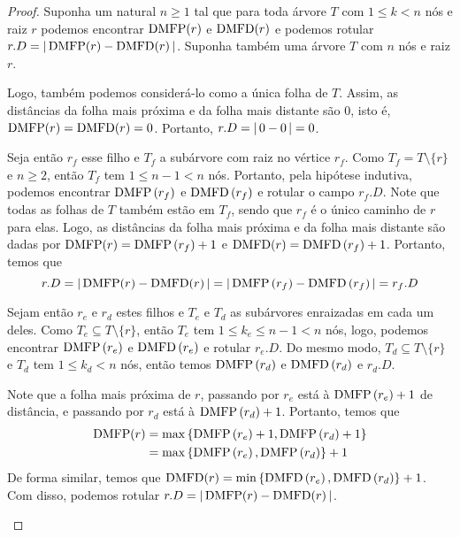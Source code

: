 \begin{proof}\resetCasos
    Suponha um natural $n \geq 1$ tal que para toda árvore $T$ com $1 \leq k < n$ nós e raiz $r$ podemos encontrar $\operatorname{DMFP}(r)$ e $\operatorname{DMFD}(r)$ e podemos rotular $r.D = {\lvert\,\operatorname{DMFP}(r) - \operatorname{DMFD}(r)\,\rvert}$. Suponha também uma árvore $T$ com $n$ nós e raiz $r$.

    \begin{case}
        Logo, também podemos considerá-lo como a única folha de $T$. Assim, as distâncias da folha mais próxima e da folha mais distante são 0, isto é, $\operatorname{DMFP}(r) = \operatorname{DMFD}(r) = 0$. Portanto, $r.D = {\lvert\,0-0\,\rvert} = 0$.
    \end{case}
    \begin{case}
        Seja então $r_f$ esse filho e $T_f$ a subárvore com raiz no vértice $r_f$. Como $T_f = T \setminus \{r\}$ e $n \geq 2$, então $T_f$ tem $1 \leq n - 1 < n$ nós. Portanto, pela hipótese indutiva, podemos encontrar $\operatorname{DMFP}\left(r_f\right)$ e $\operatorname{DMFD}\left(r_f\right)$ e rotular o campo $r_f.D$. Note que todas as folhas de $T$ também estão em $T_f$, sendo que $r_f$ é o único caminho de $r$ para elas. Logo, as distâncias da folha mais próxima e da folha mais distante são dadas por $\operatorname{DMFP}(r) = \operatorname{DMFP}\left(r_f\right) + 1$ e $\operatorname{DMFD}(r) = \operatorname{DMFD}\left(r_f\right) + 1$. Portanto, temos que
        \[
            r.D = {\lvert\,\operatorname{DMFP}(r) - \operatorname{DMFD}(r)\,\rvert} = {\lvert\,\operatorname{DMFP}\left(r_f\right) - \operatorname{DMFD}\left(r_f\right)\,\rvert} = r_f.D
        \]
    \end{case}
    \begin{case}
        Sejam então $r_e$ e $r_d$ estes filhos e $T_e$ e $T_d$ as subárvores enraizadas em cada um deles. Como $T_e \subseteq T \setminus \{r\}$, então $T_e$ tem $1 \leq k_e \leq n - 1 < n$ nós, logo, podemos encontrar $\operatorname{DMFP}\left(r_e\right)$ e $\operatorname{DMFD}\left(r_e\right)$ e rotular $r_e.D$. Do mesmo modo, $T_d \subseteq T \setminus \{r\}$ e $T_d$ tem $1 \leq k_d < n$ nós, então temos $\operatorname{DMFP}\left(r_d\right)$ e $\operatorname{DMFD}\left(r_d\right)$ e $r_d.D$.

        Note que a folha mais próxima de $r$, passando por $r_e$ está à $\operatorname{DMFP}\left(r_e\right) + 1$ de distância, e passando por $r_d$ está à $\operatorname{DMFP}\left(r_d\right) + 1$. Portanto, temos que
        \begin{align*}
            \operatorname{DMFP}(r) &= \max\left\{\operatorname{DMFP}\left(r_e\right) + 1, \operatorname{DMFP}\left(r_d\right) + 1\right\} \\
            &= \max\left\{\operatorname{DMFP}\left(r_e\right), \operatorname{DMFP}\left(r_d\right)\right\} + 1
        \end{align*}
        De forma similar, temos que $\operatorname{DMFD}(r) = \min\left\{\operatorname{DMFD}\left(r_e\right), \operatorname{DMFD}\left(r_d\right)\right\} + 1$. Com disso, podemos rotular $r.D = {\lvert\,\operatorname{DMFP}(r) - \operatorname{DMFD}(r)\,\rvert}$.
    \end{case}
\end{proof}
